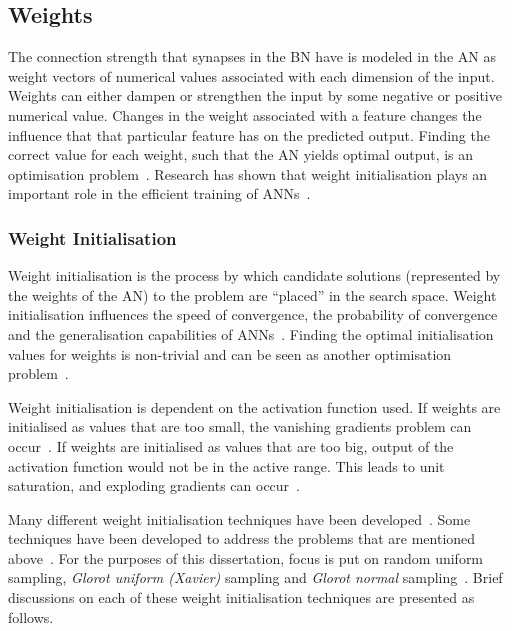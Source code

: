 \subsection{Weights}\label{sec:anns:an:weights}

The connection strength that synapses in the \acs{BN} have is modeled in the \acs{AN} as weight vectors of numerical values associated with each dimension of the input. Weights can either dampen or strengthen the input by some negative or positive numerical value. Changes in the weight associated with a feature changes the influence that that particular feature has on the predicted output. Finding the correct value for each weight, such that the \acs{AN} yields optimal output, is an optimisation problem~\cite{ref:thierens:1993}. Research has shown that weight initialisation plays an important role in the efficient training of \acp{ANN}~\cite{ref:thimm:1995}.

\subsubsection{Weight Initialisation}\label{sec:anns:an:weights:initialisation}

Weight initialisation is the process by which candidate solutions (represented by the weights of the \acs{AN}) to the problem are ``placed'' in the search space. Weight initialisation influences the speed of convergence, the probability of convergence and the generalisation capabilities of \acp{ANN}~\cite{ref:fernandez:2001}. Finding the optimal initialisation values for weights is non-trivial and can be seen as another optimisation problem~\cite{ref:de:2016, ref:erdogmus:2003, ref:yam:2000}.

Weight initialisation is dependent on the activation function used. If weights are initialised as values that are too small, the vanishing gradients problem can occur~\cite{ref:hanin:2018}. If weights are initialised as values that are too big, output of the activation function would not be in the active range. This leads to unit saturation, and exploding gradients can occur~\cite{ref:hanin:2018, ref:yadav:2018}.

Many different weight initialisation techniques have been developed~\cite{ref:erdogmus:2003}. Some techniques have been developed to address the problems that are mentioned above~\cite{ref:yadav:2018}. For the purposes of this dissertation, focus is put on random uniform sampling, \textit{Glorot uniform (Xavier)} sampling and \textit{Glorot normal} sampling~\cite{ref:glorot:2010}. Brief discussions on each of these weight initialisation techniques are presented as follows.


